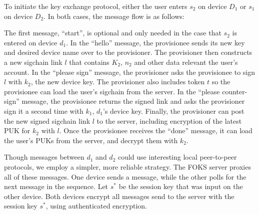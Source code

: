 To initiate the key exchange protocol, either the user enters $s_2$ on device $D_1$
or $s_1$ on device $D_2$. In both cases, the message flow is as follows:

\begin{center}
\end{center}

The first message, ``start'', is optional and only needed in the case that $s_2$
is entered on device $d_1$. In the ``hello'' message, the provisionee sends its
new key and desired device name over to the provisioner. The provisioner then
constructs a new sigchain link $l$ that contains $K_2$, $n_2$ and other data
relevant the user's account.
In the ``please sign'' message, the provisioner asks the
provisionee to sign $l$ with $k_2$, the new device key. The provisioner also
includes token $t$ so the provisionee can load the user's sigchain from the
server. In the ``please counter-sign'' message, the provisionee returns the
signed link and asks the provisioner sign it a second time with $k_1$, $d_1$'s
device key. Finally, the provisioner can post the new signed sigchain link $l$
to the server, including encryption of the latest PUK for $k_2$ with $l$. Once
the provisionee receives the ``done'' message, it can load the user's PUKs from
the server, and decrypt them with $k_2$.

Though messages between $d_1$ and $d_2$ could use interesting local peer-to-peer
protocols, we employ a simpler, more reliable strategy. The FOKS server proxies
all of these messages. One device sends a message, while the other polls for the
next message in the sequence. Let $s^{*}$ be the session key that was input on
the other device. Both devices encrypt all messages send to the server with the
session key $s^{*}$, using authenticated encryption.

